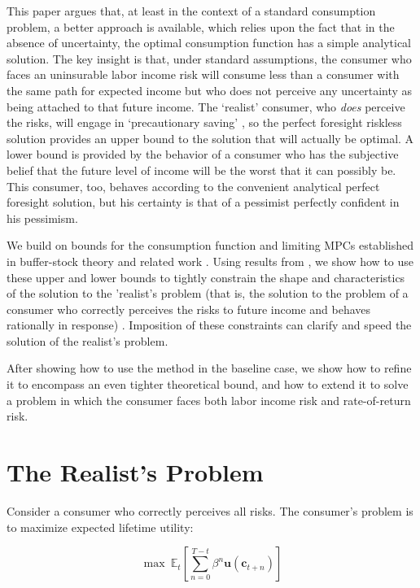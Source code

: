 \documentclass[twocolumn, switch]{article}
\newcommand{\Ex}{\mathbf{\mathbb{E}}}
\newcommand{\DiscFac}{\beta}
\newcommand{\cLvl}{\mathbf{c}}
\newcommand{\uFunc}{\mathbf{u}}
\begin{document}
This paper argues that, at least in the context of a standard consumption problem,
a better approach is available, which relies upon the fact that in the absence of
uncertainty, the optimal consumption function has a simple analytical solution. The key insight is that, under standard
assumptions, the consumer who faces an uninsurable labor income risk will
consume less than a consumer with the same path for expected income but who does
not perceive any uncertainty as being attached to that future income. The
`realist' consumer, who \textit{does} perceive the risks, will engage in
`precautionary saving' \citep{Leland1968, Sandmo1970, Kimball1990}, so the perfect foresight riskless solution provides an
upper bound to the solution that will actually be optimal. A lower bound is
provided by the behavior of a consumer who has the subjective belief that the
future level of income will be the worst that it can possibly be. This consumer,
too, behaves according to the convenient analytical perfect foresight solution,
but his certainty is that of a pessimist perfectly confident in his pessimism.

We build on bounds for the consumption function and limiting MPCs established in buffer-stock theory and related work \citep{StachurskiToda2019JET, MST2020JET}. Using results from \citet{CarrollShanker2024}, we show how to use these upper
and lower bounds to tightly constrain the shape and characteristics of the
solution to the 'realist's problem (that is, the solution to the problem of a consumer who correctly perceives the risks to future income and behaves rationally in response) \citep{Carroll1997}. Imposition of these constraints can
clarify and speed the solution of the realist's problem.

After showing how to use the method in the baseline case, we show how to refine
it to encompass an even tighter theoretical bound, and how to extend it
to solve a problem in which the consumer faces both labor income risk and rate-of-return risk.

\section{The Realist's Problem}

Consider a consumer who correctly perceives all risks. The consumer's problem is to maximize expected lifetime utility:

\begin{equation}
\label{eq:MaxProb}
\max~\Ex_{t}\left[\sum_{n=0}^{T-t}\DiscFac^{n} \uFunc(\cLvl_{t+n})\right]
\end{equation}
\end{document}
